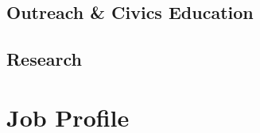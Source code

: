 \documentclass[11pt,a4paper,oneside,english]{article}
\begin{document}
\subsection[Outreach]{Outreach \& Civics Education} \label{sec:outreach}


\subsection[Research]{Research} \label{sec:research}



\section[Job Profile]{Job Profile} \label{sec:job-profile}


\printbibliography
\end{document}
